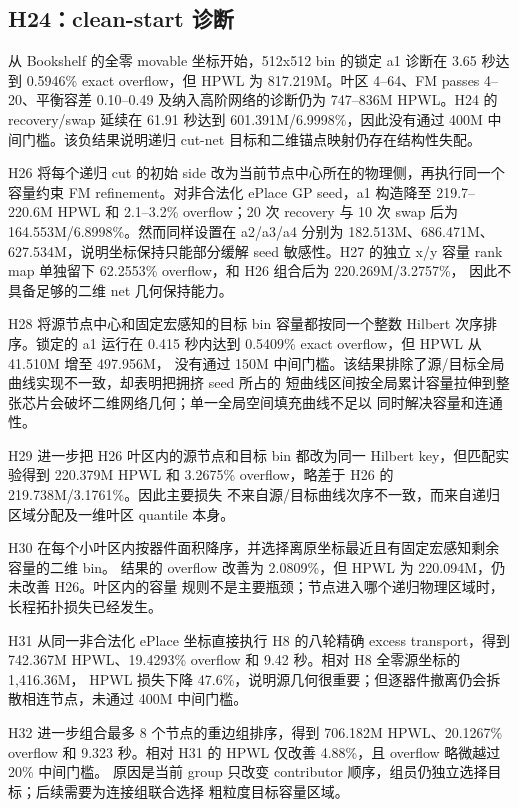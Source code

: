 \documentclass[UTF8,a4paper,11pt]{ctexart}
\begin{document}
\subsection{H24：clean-start 诊断}
从 Bookshelf 的全零 movable 坐标开始，512x512 bin 的锁定 a1 诊断在 3.65 秒达到
0.5946\% exact overflow，但 HPWL 为 817.219M。叶区 4--64、FM passes 4--20、平衡容差
0.10--0.49 及纳入高阶网络的诊断仍为 747--836M HPWL。H24 的 recovery/swap 延续在
61.91 秒达到 601.391M/6.9998\%，因此没有通过 400M 中间门槛。该负结果说明递归 cut-net
目标和二维锚点映射仍存在结构性失配。

H26 将每个递归 cut 的初始 side 改为当前节点中心所在的物理侧，再执行同一个容量约束 FM
refinement。对非合法化 ePlace GP seed，a1 构造降至 219.7--220.6M HPWL 和 2.1--3.2\%
overflow；20 次 recovery 与 10 次 swap 后为 164.553M/6.8998\%。然而同样设置在 a2/a3/a4
分别为 182.513M、686.471M、627.534M，说明坐标保持只能部分缓解 seed 敏感性。H27 的独立
x/y 容量 rank map 单独留下 62.2553\% overflow，和 H26 组合后为 220.269M/3.2757\%，
因此不具备足够的二维 net 几何保持能力。

H28 将源节点中心和固定宏感知的目标 bin 容量都按同一个整数 Hilbert 次序排序。锁定的 a1
运行在 0.415 秒内达到 0.5409\% exact overflow，但 HPWL 从 41.510M 增至 497.956M，
没有通过 150M 中间门槛。该结果排除了源/目标全局曲线实现不一致，却表明把拥挤 seed 所占的
短曲线区间按全局累计容量拉伸到整张芯片会破坏二维网络几何；单一全局空间填充曲线不足以
同时解决容量和连通性。

H29 进一步把 H26 叶区内的源节点和目标 bin 都改为同一 Hilbert key，但匹配实验得到
220.379M HPWL 和 3.2675\% overflow，略差于 H26 的 219.738M/3.1761\%。因此主要损失
不来自源/目标曲线次序不一致，而来自递归区域分配及一维叶区 quantile 本身。

H30 在每个小叶区内按器件面积降序，并选择离原坐标最近且有固定宏感知剩余容量的二维 bin。
结果的 overflow 改善为 2.0809\%，但 HPWL 为 220.094M，仍未改善 H26。叶区内的容量
规则不是主要瓶颈；节点进入哪个递归物理区域时，长程拓扑损失已经发生。

H31 从同一非合法化 ePlace 坐标直接执行 H8 的八轮精确 excess transport，得到
742.367M HPWL、19.4293\% overflow 和 9.42 秒。相对 H8 全零源坐标的 1,416.36M，
HPWL 损失下降 47.6\%，说明源几何很重要；但逐器件撤离仍会拆散相连节点，未通过 400M
中间门槛。

H32 进一步组合最多 8 个节点的重边组排序，得到 706.182M HPWL、20.1267\% overflow
和 9.323 秒。相对 H31 的 HPWL 仅改善 4.88\%，且 overflow 略微越过 20\% 中间门槛。
原因是当前 group 只改变 contributor 顺序，组员仍独立选择目标；后续需要为连接组联合选择
粗粒度目标容量区域。
\end{document}
